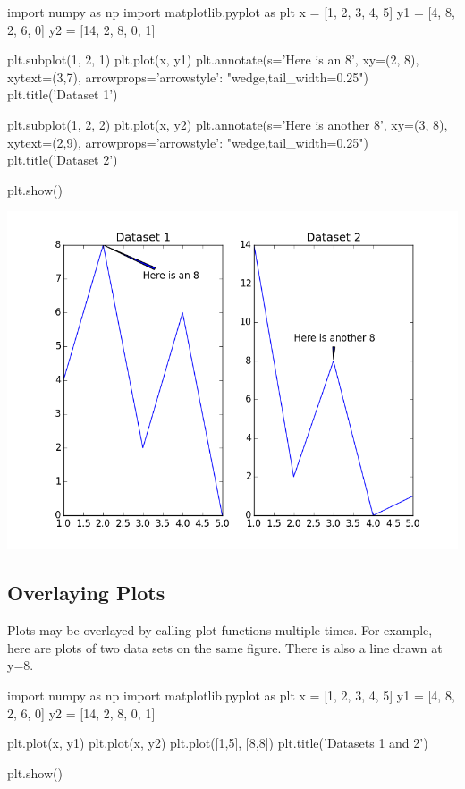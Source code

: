 \documentclass[11pt]{cselabheader}
\begin{document}
\begin{python3code}
import numpy as np
import matplotlib.pyplot as plt
x = [1, 2, 3, 4, 5]
y1 = [4, 8, 2, 6, 0]
y2 = [14, 2, 8, 0, 1]

plt.subplot(1, 2, 1)
plt.plot(x, y1)
plt.annotate(s='Here is an 8', xy=(2, 8), xytext=(3,7),
             arrowprops={'arrowstyle': "wedge,tail_width=0.25"})
plt.title('Dataset 1')

plt.subplot(1, 2, 2)
plt.plot(x, y2)
plt.annotate(s='Here is another 8', xy=(3, 8), xytext=(2,9),
             arrowprops={'arrowstyle': "wedge,tail_width=0.25"})
plt.title('Dataset 2')

plt.show()
\end{python3code}

\begin{center}
\includegraphics[width=\textwidth]{img/matplotlib_labeledsubplot.png}
\end{center}

\subsection{Overlaying Plots}
Plots may be overlayed by calling plot functions multiple times.
For example, here are plots of two data sets on the same figure.
There is also a line drawn at y=8.

\begin{python3code}
import numpy as np
import matplotlib.pyplot as plt
x = [1, 2, 3, 4, 5]
y1 = [4, 8, 2, 6, 0]
y2 = [14, 2, 8, 0, 1]

plt.plot(x, y1)
plt.plot(x, y2)
plt.plot([1,5], [8,8])
plt.title('Datasets 1 and 2')

plt.show()
\end{python3code}
\end{document}
